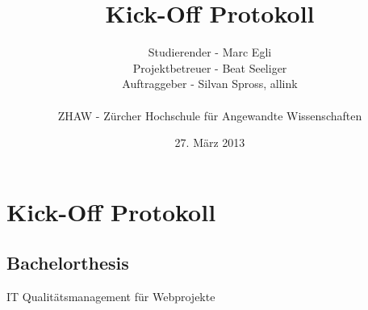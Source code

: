 \documentclass[]{scrreprt}
\title{Kick-Off Protokoll}
\author{Studierender - Marc Egli\\
    Projektbetreuer - Beat Seeliger\\
    Auftraggeber - Silvan Spross, allink\\
    \\
    ZHAW - Zürcher Hochschule für Angewandte Wissenschaften}
\date{27. März 2013}
\begin{document}
    \ifpdf
    \else
    \fi

    \maketitle



    \chapter{Kick-Off Protokoll}

    \section{Bachelorthesis}
    IT Qualitätsmanagement für Webprojekte
\end{document}
